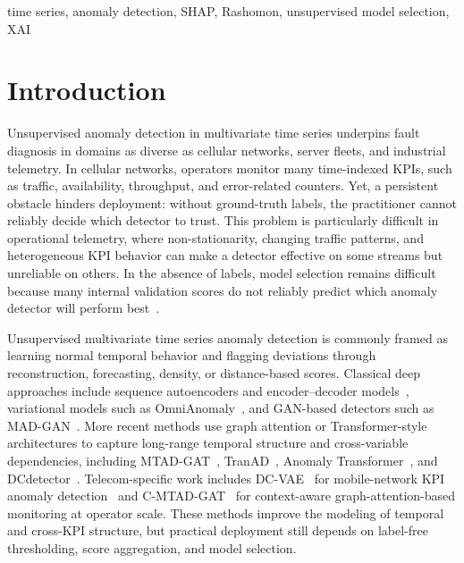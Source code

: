\documentclass[conference]{IEEEtran}
\begin{document}
\begin{IEEEkeywords}
time series, anomaly detection, SHAP, Rashomon, unsupervised model selection, XAI
\end{IEEEkeywords}

\section{Introduction}
\label{sec:intro}

Unsupervised anomaly detection in multivariate time series underpins
fault diagnosis in domains as diverse as cellular networks, server
fleets, and industrial telemetry. In cellular networks, operators monitor many time-indexed
KPIs, such as traffic, availability,
throughput, and error-related counters. Yet, a persistent obstacle 
hinders deployment: without ground-truth labels, the practitioner cannot
reliably decide which detector to trust. This problem is particularly difficult
in operational telemetry, where non-stationarity, changing traffic
patterns, and heterogeneous KPI behavior can make a detector effective
on some streams but unreliable on others. In the absence of labels, model
selection remains difficult because many internal validation scores do
not reliably predict which anomaly detector will perform
best~\cite{MaZhao2023}.

Unsupervised multivariate time series anomaly detection is commonly
framed as learning normal temporal behavior and flagging deviations
through reconstruction, forecasting, density, or distance-based scores. Classical deep approaches include sequence autoencoders and
encoder--decoder models~\cite{LSTM-ED}, variational models such as
OmniAnomaly~\cite{OmniAnomaly}, and GAN-based detectors such as
MAD-GAN~\cite{mad-gan}. More recent methods use graph attention or
Transformer-style architectures to capture long-range temporal structure
and cross-variable dependencies, including MTAD-GAT~\cite{mtad-gat},
TranAD~\cite{Tuli2022}, Anomaly Transformer~\cite{Xu2022}, and
DCdetector~\cite{Yang2023}. Telecom-specific work includes DC-VAE~\cite{gonzalez2023one} for
mobile-network KPI anomaly detection~\cite{garcia2023onemodel} and C-MTAD-GAT~\cite{Malacarne2026}
for context-aware graph-attention-based monitoring at operator
scale. These methods improve the modeling of
temporal and cross-KPI structure, but practical deployment still depends
on label-free thresholding, score aggregation, and model selection.
\end{document}
